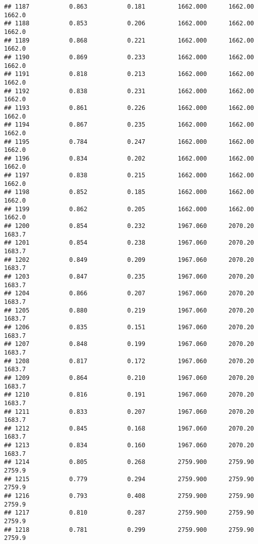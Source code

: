 \documentclass[
]{article}
\begin{document}
\begin{verbatim}
## 1187           0.863           0.181         1662.000      1662.00       1662.0
## 1188           0.853           0.206         1662.000      1662.00       1662.0
## 1189           0.868           0.221         1662.000      1662.00       1662.0
## 1190           0.869           0.233         1662.000      1662.00       1662.0
## 1191           0.818           0.213         1662.000      1662.00       1662.0
## 1192           0.838           0.231         1662.000      1662.00       1662.0
## 1193           0.861           0.226         1662.000      1662.00       1662.0
## 1194           0.867           0.235         1662.000      1662.00       1662.0
## 1195           0.784           0.247         1662.000      1662.00       1662.0
## 1196           0.834           0.202         1662.000      1662.00       1662.0
## 1197           0.838           0.215         1662.000      1662.00       1662.0
## 1198           0.852           0.185         1662.000      1662.00       1662.0
## 1199           0.862           0.205         1662.000      1662.00       1662.0
## 1200           0.854           0.232         1967.060      2070.20       1683.7
## 1201           0.854           0.238         1967.060      2070.20       1683.7
## 1202           0.849           0.209         1967.060      2070.20       1683.7
## 1203           0.847           0.235         1967.060      2070.20       1683.7
## 1204           0.866           0.207         1967.060      2070.20       1683.7
## 1205           0.880           0.219         1967.060      2070.20       1683.7
## 1206           0.835           0.151         1967.060      2070.20       1683.7
## 1207           0.848           0.199         1967.060      2070.20       1683.7
## 1208           0.817           0.172         1967.060      2070.20       1683.7
## 1209           0.864           0.210         1967.060      2070.20       1683.7
## 1210           0.816           0.191         1967.060      2070.20       1683.7
## 1211           0.833           0.207         1967.060      2070.20       1683.7
## 1212           0.845           0.168         1967.060      2070.20       1683.7
## 1213           0.834           0.160         1967.060      2070.20       1683.7
## 1214           0.805           0.268         2759.900      2759.90       2759.9
## 1215           0.779           0.294         2759.900      2759.90       2759.9
## 1216           0.793           0.408         2759.900      2759.90       2759.9
## 1217           0.810           0.287         2759.900      2759.90       2759.9
## 1218           0.781           0.299         2759.900      2759.90       2759.9

\end{verbatim}
\end{document}
